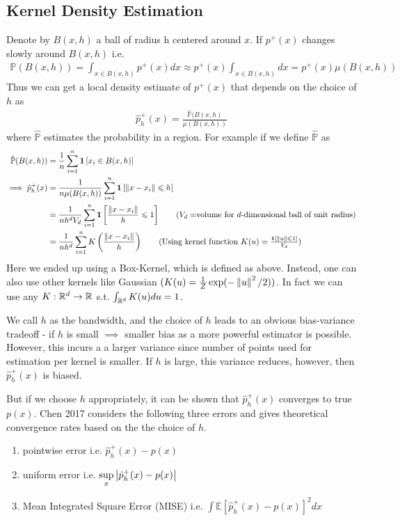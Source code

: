\documentclass[11pt]{report}
\begin{document}
\subsection{Kernel Density Estimation}
Denote by $B(x, h)$ a ball of radius h centered around $x$. If $p^+(x)$ changes slowly around $B(x,h)$ i.e. 
\begin{align}
    \mathbb{P}(B(x,h)) = \int _{x \in B(x,h)} p^+(x)dx \approx p^+(x) \int _{x \in B(x,h)} dx = p^+(x) \mu(B(x,h))
\end{align}
Thus we can get a local density estimate of $p^+(x)$ that depends on the choice of $h$ as
\begin{align}
    \hat{p}_h^+(x) = \frac{\hat{\mathbb{P}}(B(x,h)}{\mu(B(x,h))}
\end{align}
where $\hat{\mathbb{P}}$ estimates the probability in a region. For example if we define $\hat{\mathbb{P}}$ as
\begin{align}
    \hat{\mathbb{P}}(B(x,h)) &= \frac{1}{n} \sum _{i=1} ^n \bm{1}\left[ x_i \in B(x,h)\right]\\
    \implies \hat{p}_h^+(x) &= \frac{1}{n \mu(B(x,h))}\sum _{i=1} ^n \bm{1}\left[ \norm{x - x_i} \leq h\right] \nonumber\\
    &= \frac{1}{nh^dV_d}\sum _{i=1} ^n \bm{1}\left[ \frac{\norm{x - x_i}}{h} \leq 1\right] \tag*{\text{($V_d=$volume for $d$-dimensional ball of unit radius)}} \nonumber\\
    &= \frac{1}{nh^d}\sum _{i=1} ^n K\left(\frac{\norm{x - x_i}}{h}\right) \tag*{\text{(Using kernel function $K(u) = \frac{\bm{1}[\norm{u} \leq 1]}{V_d}$)}} \nonumber\\
\end{align}
Here we ended up using a Box-Kernel, which is defined as above. Instead, one can also use other kernels like Gaussian $(K(u) = \frac{1}{Z} \exp(-\left\lVert u \right\rVert^2/2))$. In fact we can use any $K: \mathbb{R}^d \rightarrow \mathbb{R}$ s.t. $\int _{\mathbb{R}^d} K(u)du = 1$. 

We call $h$ as the bandwidth, and the choice of $h$ leads to an obvious
bias-variance tradeoff - if $h$ is small $\implies$ smaller bias as a more
powerful estimator is possible. However, this incurs a a larger variance since
number of points used for estimation per kernel is smaller. If $h$ is large,
this variance reduces, however, then $\hat{p}_h^+(x)$ is biased. 

But if we choose $h$ appropriately, it can be shown that $\hat{p}_h^+(x)$ converges to true $p(x)$. Chen 2017 \cite{Chen2017-ns} considers the following three errors and gives theoretical convergence rates based on the the choice of $h$. \begin{enumerate}
    \item pointwise error i.e. $\hat{p}_h^+(x) - p(x)$
    \item uniform error i.e. $\sup\limits_x \left\lvert{\hat{p}_h^+(x) - p(x)}\right\rvert$ 
    \item Mean Integrated Square Error (MISE) i.e. $\int \mathbb{E}\left[\hat{p}_h^+(x) - p(x)\right]^2dx$
\end{enumerate} 
\end{document}
